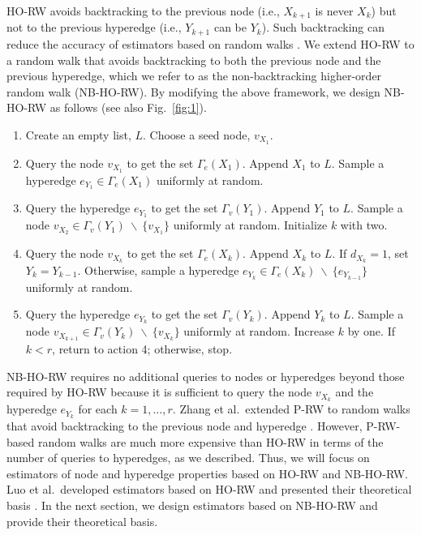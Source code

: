 HO-RW avoids backtracking to the previous node (i.e., \(X_{k+1}\) is never \(X_k\)) but not to the previous hyperedge (i.e., \(Y_{k+1}\) can be \(Y_k\)).
Such backtracking can reduce the accuracy of estimators based on random walks \cite{lee2012, li2015}.
We extend HO-RW to a random walk that avoids backtracking to both the previous node and the previous hyperedge, which we refer to as the non-backtracking higher-order random walk (NB-HO-RW).
By modifying the above framework, we design NB-HO-RW as follows (see also Fig.~\ref{fig:1}).

\begin{enumerate}
\item Create an empty list, $L$. Choose a seed node, $v_{X_1}$. 
\item Query the node $v_{X_1}$ to get the set $\Gamma_e(X_{1})$. Append $X_1$ to $L$. Sample a hyperedge $e_{Y_{1}} \in \Gamma_e(X_{1})$ uniformly at random. 
\item Query the hyperedge $e_{Y_1}$ to get the set $\Gamma_v(Y_{1})$. Append $Y_1$ to $L$. Sample a node $v_{X_{2}} \in \Gamma_v(Y_{1})\ \backslash\ \{v_{X_1}\}$ uniformly at random. Initialize $k$ with two.
\item Query the node $v_{X_k}$ to get the set $\Gamma_e(X_{k})$. Append $X_k$ to $L$. If $d_{X_k} = 1$, set $Y_{k} = Y_{k-1}$. Otherwise, sample a hyperedge $e_{Y_{k}} \in \Gamma_e(X_{k})\ \backslash\ \{e_{Y_{k-1}}\}$ uniformly at random.
\item Query the hyperedge $e_{Y_k}$ to get the set $\Gamma_v(Y_{k})$. Append $Y_k$ to $L$. Sample a node $v_{X_{k+1}} \in \Gamma_v(Y_{k})\ \backslash\ \{v_{X_k}\}$ uniformly at random. Increase $k$ by one. If $k < r$, return to action 4; otherwise, stop.
\end{enumerate}

NB-HO-RW requires no additional queries to nodes or hyperedges beyond those required by HO-RW because it is sufficient to query the node $v_{X_k}$ and the hyperedge $e_{Y_k}$ for each $k = 1, \ldots, r$.
Zhang et al.~extended P-RW to random walks that avoid backtracking to the previous node and hyperedge \cite{zhang2023}. 
However, P-RW-based random walks are much more expensive than HO-RW in terms of the number of queries to hyperedges, as we described.
Thus, we will focus on estimators of node and hyperedge properties based on HO-RW and NB-HO-RW.
Luo et al.~developed estimators based on HO-RW and presented their theoretical basis \cite{luo2024}.
In the next section, we design estimators based on NB-HO-RW and provide their theoretical basis.

